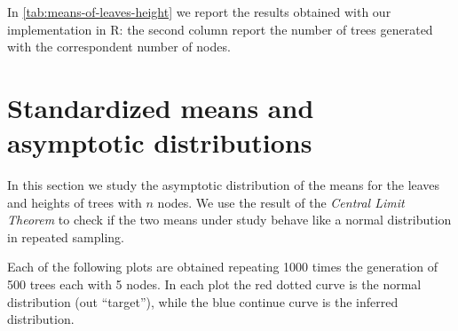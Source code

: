 In \autoref{tab:means-of-leaves-height} we report the results
obtained with our implementation in R: the second column report the
number of trees generated with the correspondent number of nodes.
\begin{table}[!ht]
  \begin{center}
    \label{tab:means-of-leaves-height}
    \caption{Theoretical and empirical means for leaves and height}
  \end{center}
\end{table}

\section{Standardized means and asymptotic distributions}

In this section we study the asymptotic distribution of the means for
the leaves and heights of trees with $n$ nodes. We use the result of
the \emph{Central Limit Theorem} to check if the two means under study
behave like a normal distribution in repeated sampling.

Each of the following plots are obtained repeating 1000 times the
generation of 500 trees each with 5 nodes. In each plot the red dotted
curve is the normal distribution (out ``target''), while the blue
continue curve is the inferred distribution.

